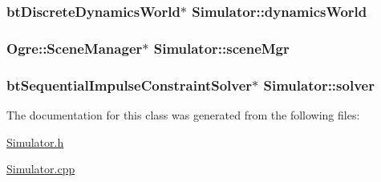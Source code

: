 \hypertarget{classSimulator_a287d65d2e05fece22279b022886292ef}{
\subsubsection[{dynamics\-World}]{\setlength{\rightskip}{0pt plus 5cm}bt\-Discrete\-Dynamics\-World$\ast$ Simulator\-::dynamics\-World\hspace{0.3cm}{\ttfamily [private]}}}\label{classSimulator_a287d65d2e05fece22279b022886292ef}
\hypertarget{classSimulator_ab5748cbb0ec57cd4922d2e88766fb8a2}{
\subsubsection[{scene\-Mgr}]{\setlength{\rightskip}{0pt plus 5cm}Ogre\-::\-Scene\-Manager$\ast$ Simulator\-::scene\-Mgr}}\label{classSimulator_ab5748cbb0ec57cd4922d2e88766fb8a2}
\hypertarget{classSimulator_a2da0915f8ba415561a147b72659ef17a}{
\subsubsection[{solver}]{\setlength{\rightskip}{0pt plus 5cm}bt\-Sequential\-Impulse\-Constraint\-Solver$\ast$ Simulator\-::solver\hspace{0.3cm}{\ttfamily [private]}}}\label{classSimulator_a2da0915f8ba415561a147b72659ef17a}


The documentation for this class was generated from the following files\-:\begin{DoxyCompactItemize}
\item 
\hyperlink{Simulator_8h}{Simulator.\-h}\item 
\hyperlink{Simulator_8cpp}{Simulator.\-cpp}\end{DoxyCompactItemize}
